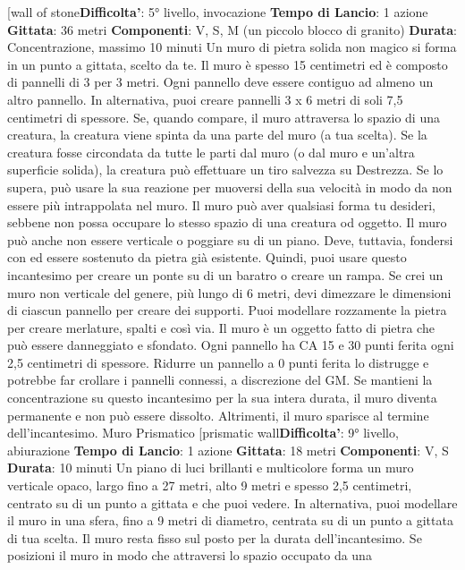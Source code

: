 \begin{multicols}{2}
[wall of stone\textbf{Difficolta'}:
5° livello, invocazione
\textbf{Tempo di Lancio}: 1 azione
\textbf{Gittata}: 36 metri
\textbf{Componenti}: V, S, M (un piccolo blocco di granito)
\textbf{Durata}: Concentrazione, massimo 10 minuti
Un muro di pietra solida non magico si forma in un
punto a gittata, scelto da te. Il muro è spesso 15
centimetri ed è composto di pannelli di 3 per 3 metri.
Ogni pannello deve essere contiguo ad almeno un altro
pannello. In alternativa, puoi creare pannelli 3 x 6 metri
di soli 7,5 centimetri di spessore.
Se, quando compare, il muro attraversa lo spazio di una
creatura, la creatura viene spinta da una parte del muro
(a tua scelta). Se la creatura fosse circondata da tutte le
parti dal muro (o dal muro e un’altra superficie solida),
la creatura può effettuare un tiro salvezza su Destrezza.
Se lo supera, può usare la sua reazione per muoversi
della sua velocità in modo da non essere più
intrappolata nel muro.
Il muro può aver qualsiasi forma tu desideri, sebbene
non possa occupare lo stesso spazio di una creatura od
oggetto. Il muro può anche non essere verticale o
poggiare su di un piano. Deve, tuttavia, fondersi con ed
essere sostenuto da pietra già esistente. Quindi, puoi
usare questo incantesimo per creare un ponte su di un
baratro o creare un rampa.
Se crei un muro non verticale del genere, più lungo di 6
metri, devi dimezzare le dimensioni di ciascun pannello
per creare dei supporti. Puoi modellare rozzamente la
pietra per creare merlature, spalti e così via.
Il muro è un oggetto fatto di pietra che può essere
danneggiato e sfondato. Ogni pannello ha CA 15 e 30
punti ferita ogni 2,5 centimetri di spessore. Ridurre un
pannello a 0 punti ferita lo distrugge e potrebbe far
crollare i pannelli connessi, a discrezione del GM.
Se mantieni la concentrazione su questo incantesimo
per la sua intera durata, il muro diventa permanente e
non può essere dissolto. Altrimenti, il muro sparisce al
termine dell’incantesimo.
Muro Prismatico
[prismatic wall\textbf{Difficolta'}:
9° livello, abiurazione
\textbf{Tempo di Lancio}: 1 azione
\textbf{Gittata}: 18 metri
\textbf{Componenti}: V, S
\textbf{Durata}: 10 minuti
Un piano di luci brillanti e multicolore forma un muro
verticale opaco, largo fino a 27 metri, alto 9 metri e
spesso 2,5 centimetri, centrato su di un punto a gittata
e che puoi vedere. In alternativa, puoi modellare il muro
in una sfera, fino a 9 metri di diametro, centrata su di un
punto a gittata di tua scelta. Il muro resta fisso sul posto
per la durata dell’incantesimo. Se posizioni il muro in
modo che attraversi lo spazio occupato da una

\end{multicols}
